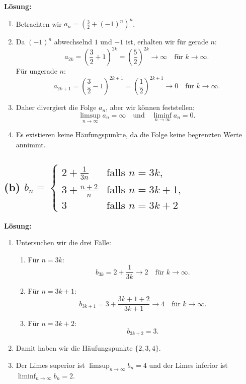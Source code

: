 \documentclass[11pt]{article}
\begin{document}
\textbf{Lösung:}
\begin{enumerate}
    \item Betrachten wir \( a_n = \left( \frac{3}{2} + (-1)^n \right)^n \).
    \item Da \( (-1)^n \) abwechselnd \( 1 \) und \( -1 \) ist, erhalten wir für gerade \( n \):
        \[
        a_{2k} = \left( \frac{3}{2} + 1 \right)^{2k} = \left( \frac{5}{2} \right)^{2k} \to \infty \quad \text{für } k \to \infty.
        \]
        Für ungerade \( n \):
        \[
        a_{2k+1} = \left( \frac{3}{2} - 1 \right)^{2k+1} = \left( \frac{1}{2} \right)^{2k+1} \to 0 \quad \text{für } k \to \infty.
        \]
    \item Daher divergiert die Folge \( a_n \), aber wir können feststellen:
        \[
        \limsup_{n \to \infty} a_n = \infty \quad \text{und} \quad \liminf_{n \to \infty} a_n = 0.
        \]
    \item Es existieren keine Häufungspunkte, da die Folge keine begrenzten Werte annimmt.
\end{enumerate}

\subsection*{(b) \( b_n = \begin{cases}
2 + \frac{1}{3n} & \text{falls } n = 3k, \\
3 + \frac{n+2}{n} & \text{falls } n = 3k + 1, \\
3 & \text{falls } n = 3k + 2
\end{cases} \)}

\textbf{Lösung:}
\begin{enumerate}
    \item Untersuchen wir die drei Fälle:
        \begin{enumerate}
            \item Für \( n = 3k \):
            \[
            b_{3k} = 2 + \frac{1}{3k} \to 2 \quad \text{für } k \to \infty.
            \]
            \item Für \( n = 3k + 1 \):
            \[
            b_{3k+1} = 3 + \frac{3k+1 + 2}{3k+1} \to 4 \quad \text{für } k \to \infty.
            \]
            \item Für \( n = 3k + 2 \):
            \[
            b_{3k+2} = 3.
            \]
        \end{enumerate}
    \item Damit haben wir die Häufungspunkte \( \{2, 3, 4\} \).
    \item Der Limes superior ist \( \limsup_{n \to \infty} b_n = 4 \) und der Limes inferior ist \( \liminf_{n \to \infty} b_n = 2 \).
\end{enumerate}
\end{document}
